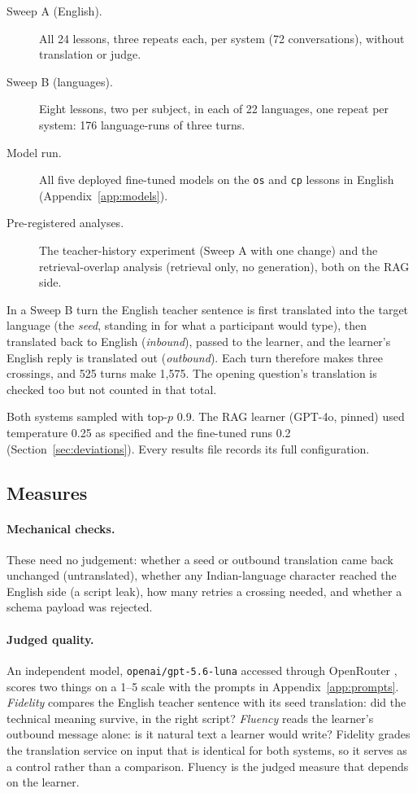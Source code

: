 \documentclass[pdflatex,sn-mathphys-num]{sn-jnl}%
\theoremstyle{thmstyleone}%
\theoremstyle{thmstyletwo}%
\theoremstyle{thmstylethree}%
\begin{document}
\begin{description}
\item[Sweep A (English).] All 24 lessons, three repeats each, per system (72 conversations), without
translation or judge.
\item[Sweep B (languages).] Eight lessons, two per subject, in each of 22 languages, one repeat per
system: 176 language-runs of three turns.
\item[Model run.] All five deployed fine-tuned models on the \texttt{os} and \texttt{cp} lessons in
English (Appendix~\ref{app:models}).
\item[Pre-registered analyses.] The teacher-history experiment (Sweep A with one change) and the
retrieval-overlap analysis (retrieval only, no generation), both on the RAG side.
\end{description}

In a Sweep B turn the English teacher sentence is first translated into the target language (the
\emph{seed}, standing in for what a participant would type), then translated back to English
(\emph{inbound}), passed to the learner, and the learner's English reply is translated out
(\emph{outbound}). Each turn therefore makes three crossings, and 525 turns make 1,575. The opening
question's translation is checked too but not counted in that total.

Both systems sampled with top-$p$ 0.9. The RAG learner (GPT-4o, pinned) used temperature 0.25 as
specified and the fine-tuned runs 0.2 (Section~\ref{sec:deviations}). Every results file records its
full configuration.

\subsection{Measures}\label{sec:measures}

\paragraph{Mechanical checks.} These need no judgement: whether a seed or outbound translation came
back unchanged (untranslated), whether any Indian-language character reached the English side (a
script leak), how many retries a crossing needed, and whether a schema payload was rejected.

\paragraph{Judged quality.} An independent model, \texttt{openai/gpt-5.6-luna} accessed through
OpenRouter \cite{gptluna}, scores two things on a 1--5 scale with the prompts in
Appendix~\ref{app:prompts}. \emph{Fidelity} compares the English teacher sentence with its seed
translation: did the technical meaning survive, in the right script? \emph{Fluency} reads the
learner's outbound message alone: is it natural text a learner would write? Fidelity grades the
translation service on input that is identical for both systems, so it serves as a control rather
than a comparison. Fluency is the judged measure that depends on the learner.
\end{document}
